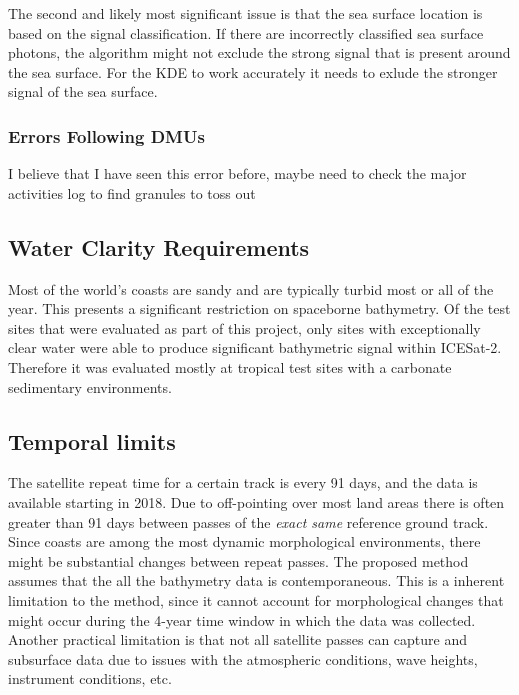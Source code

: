 The second and likely most significant issue is that the sea surface location is based on the signal classification. If there are incorrectly classified sea surface photons, the algorithm might not exclude the strong signal that is present around the sea surface. For the KDE to work accurately it needs to exlude the stronger signal of the sea surface. 

\subsubsection{Errors Following DMUs}

I believe that I have seen this error before, maybe need to check the major activities log to find granules to toss out


\subsection{Water Clarity Requirements}

Most of the world's coasts are sandy and are typically turbid most or all of the year. This presents a significant restriction on spaceborne bathymetry. Of the test sites that were evaluated as part of this project, only sites with exceptionally clear water were able to produce significant bathymetric signal within ICESat-2. Therefore it was evaluated mostly at tropical test sites with a carbonate sedimentary environments.  

\subsection{Temporal limits}

The satellite repeat time for a certain track is every 91 days, and the data is available starting in 2018. Due to off-pointing over most land areas there is often greater than 91 days between passes of the \emph{exact same} reference ground track. Since coasts are among the most dynamic morphological environments, there might be substantial changes between repeat passes. The proposed method assumes that the all the bathymetry data is contemporaneous. This is a inherent limitation to the method, since it cannot account for morphological changes that might occur during the 4-year time window in which the data was collected. Another practical limitation is that not all satellite passes can capture and subsurface data due to issues with the atmospheric conditions, wave heights, instrument conditions, etc. 

